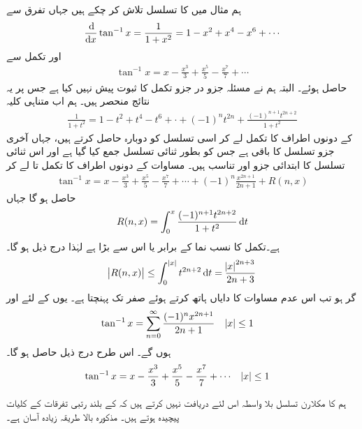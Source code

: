 ہم مثال  میں  کا تسلسل تلاش کر چکے ہیں جہاں تفرق سے
\begin{align*}
\frac{\dif}{\dif x}\tan^{-1}x=\frac{1}{1+x^2}=1-x^2+x^4-x^6+\cdots
\end{align*}
اور تکمل سے
\begin{align*}
\tan^{-1}x=x-\frac{x^3}{3}+\frac{x^5}{5}-\frac{x^7}{7}+\cdots
\end{align*}
حاصل ہوئے۔ البتہ ہم نے مسئلہ جزو در جزو تکمل کا ثبوت پیش نہیں کیا ہے جس پر یہ نتائج منحصر ہیں۔ ہم اب متناہی کلیہ
\begin{align}\label{مساوات_تسلسل_الٹ_ٹینجنٹ_الف}
\frac{1}{1+t^2}=1-t^2+t^4-t^6+\cdot+(-1)^nt^{2n}+\frac{(-1)^{n+1}t^{2n+2}}{1+t^2}
\end{align}
کے دونوں اطراف کا تکمل لے کر اسی تسلسل کو دوبارہ حاصل کرتے ہیں، جہاں آخری جزو تسلسل کا باقی ہے جس  کو بطور ثنائی تسلسل جمع کیا گیا ہے اور اس ثنائی تسلسل کا ابتدائی جزو  اور تناسب  ہیں۔ مساوات  کے دونوں اطراف کا تکمل  تا  لے کر
\begin{align*}
\tan^{-1}x=x-\frac{x^3}{3}+\frac{x^5}{5}-\frac{x^7}{7}+\cdots+(-1)^n\frac{x^{2n+1}}{2n+1}+R(n,x)
\end{align*}
حاصل ہو گا جہاں 
\begin{align*}
R(n,x)=\int_0^x \frac{(-1)^{n+1}t^{2n+2}}{1+t^2}\dif t
\end{align*}
ہے۔تکمل کا نسب نما  کے برابر یا اس سے بڑا ہے لہٰذا درج ذیل ہو گا۔
\begin{align*}
\abs{R(n,x)}\le \int_0^{\,\abs{x}}t^{2n+2}\dif t=\frac{\abs{x}^{2n+3}}{2n+3}
\end{align*}
گر  ہو تب اس عدم مساوات کا دایاں ہاتھ  کرتے ہوئے صفر تک پہنچتا ہے۔ یوں  کے لئے   اور
\begin{align*}
\tan^{-1}x&=\sum_{n=0}^{\infty}\frac{(-1)^nx^{2n+1}}{2n+1}&&\abs{x}\le 1
\end{align*}
ہوں گے۔ اس طرح درج ذیل حاصل ہو گا۔
\begin{align}\label{مساوات_تسلسل_الٹ_ٹینجنٹ_کلیہ}
\tan^{-1}x&=x-\frac{x^3}{3}+\frac{x^5}{5}-\frac{x^7}{7}+\cdots&&\abs{x}\le 1
\end{align}

ہم  کا مکلارن تسلسل بلا واسطہ اس لئے دریافت نہیں کرتے ہیں کہ  کے بلند رتبی تفرقات کے کلیات پیچیدہ ہوتے ہیں۔ مذکورہ بالا طریقہ زیادہ آسان ہے۔

